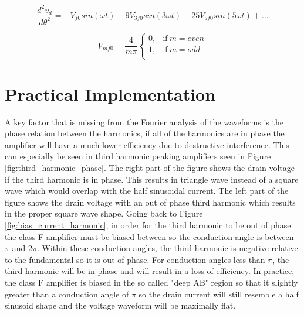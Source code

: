 \begin{equation}\label{eq:fs_2nd_derv}
  \frac{d^2 v_d}{d \theta^2} = -V_{f0}sin(\omega t) -9V_{3f0}sin(3\omega t) - 25V_{5f0}sin(5\omega t) + \ldots
\end{equation}


\begin{equation}\label{eq:fs_squarewave}
    V_{mf0} = \frac{4}{m\pi}
    \begin{cases}
        0, & \text{if}\ m = even\\
        1, & \text{if}\ m = odd\\
    \end{cases}
\end{equation}

%

\section{Practical Implementation}

A key factor that is missing from the Fourier analysis of the waveforms is the phase relation between the harmonics, if all of the harmonics are in phase the amplifier will have a much lower efficiency due to destructive interference. This can especially be seen in third harmonic peaking amplifiers seen in Figure \ref{fig:third_harmonic_phase}. The right part of the figure shows the drain voltage if the third harmonic is in phase. This results in triangle wave instead of a square wave which would overlap with the half sinusoidal current. The left part of the figure shows the drain voltage with an out of phase third harmonic which results in the proper square wave shape. Going back to Figure \ref{fig:bias_current_harmonic}, in order for the third harmonic to be out of phase the class F amplifier must be biased between so the conduction angle is between $\pi$ and $2\pi$. Within these conduction angles, the third harmonic is negative relative to the fundamental so it is out of phase. For conduction angles less than $\pi$, the third harmonic will be in phase and will result in a loss of efficiency. In practice, the class F amplifier is biased in the so called "deep AB" region so that it slightly greater than a conduction angle of $\pi$ so the drain current will still resemble a half sinusoid shape and the voltage waveform will be maximally flat.

